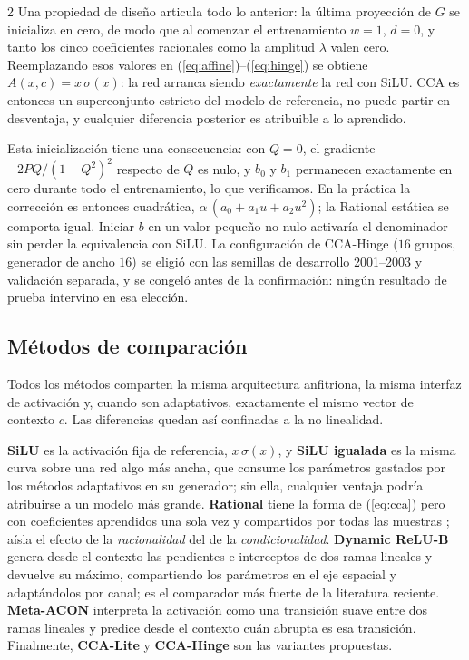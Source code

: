 \begin{multicols}{2}
Una propiedad de diseño articula todo lo anterior: la última proyección de $G$ se inicializa en cero, de modo que al comenzar el entrenamiento $w=1$, $d=0$, y tanto los cinco coeficientes racionales como la amplitud $\lambda$ valen cero. Reemplazando esos valores en (\ref{eq:affine})--(\ref{eq:hinge}) se obtiene $A(x,c)=x\,\sigma(x)$: la red arranca siendo \textit{exactamente} la red con SiLU. CCA es entonces un superconjunto estricto del modelo de referencia, no puede partir en desventaja, y cualquier diferencia posterior es atribuible a lo aprendido.

Esta inicialización tiene una consecuencia: con $Q=0$, el gradiente $-2PQ/(1+Q^{2})^{2}$ respecto de $Q$ es nulo, y $b_0$ y $b_1$ permanecen exactamente en cero durante todo el entrenamiento, lo que verificamos. En la práctica la corrección es entonces cuadrática, $\alpha\,(a_0+a_1u+a_2u^{2})$; la Rational estática se comporta igual. Iniciar $b$ en un valor pequeño no nulo activaría el denominador sin perder la equivalencia con SiLU. La configuración de CCA-Hinge ($16$ grupos, generador de ancho $16$) se eligió con las semillas de desarrollo 2001--2003 y validación separada, y se congeló antes de la confirmación: ningún resultado de prueba intervino en esa elección.

\subsection{Métodos de comparación}

Todos los métodos comparten la misma arquitectura anfitriona, la misma interfaz de activación y, cuando son adaptativos, exactamente el mismo vector de contexto $c$. Las diferencias quedan así confinadas a la no linealidad.

\textbf{SiLU} \cite{silu} es la activación fija de referencia, $x\,\sigma(x)$, y \textbf{SiLU igualada} es la misma curva sobre una red algo más ancha, que consume los parámetros gastados por los métodos adaptativos en su generador; sin ella, cualquier ventaja podría atribuirse a un modelo más grande. \textbf{Rational} tiene la forma de (\ref{eq:cca}) pero con coeficientes aprendidos una sola vez y compartidos por todas las muestras \cite{boulle2020rational,molina2020pade}; aísla el efecto de la \textit{racionalidad} del de la \textit{condicionalidad}. \textbf{Dynamic ReLU-B} \cite{chen2020dynamic} genera desde el contexto las pendientes e interceptos de dos ramas lineales y devuelve su máximo, compartiendo los parámetros en el eje espacial y adaptándolos por canal; es el comparador más fuerte de la literatura reciente. \textbf{Meta-ACON} \cite{ma2021activate} interpreta la activación como una transición suave entre dos ramas lineales y predice desde el contexto cuán abrupta es esa transición. Finalmente, \textbf{CCA-Lite} y \textbf{CCA-Hinge} son las variantes propuestas.


\end{multicols}
